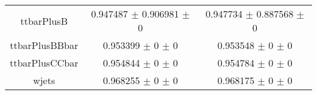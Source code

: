 \begin{table}
\begin{tabular}{ccc}
ttbarPlusB & \num{0.947487} $\pm$ \num{0.906981} $\pm$ \num{0} & \num{0.947734} $\pm$ \num{0.887568} $\pm$ \num{0}\\
ttbarPlusBBbar & \num{0.953399} $\pm$ \num{0} $\pm$ \num{0} & \num{0.953548} $\pm$ \num{0} $\pm$ \num{0}\\
ttbarPlusCCbar & \num{0.954844} $\pm$ \num{0} $\pm$ \num{0} & \num{0.954784} $\pm$ \num{0} $\pm$ \num{0}\\
wjets & \num{0.968255} $\pm$ \num{0} $\pm$ \num{0} & \num{0.968175} $\pm$ \num{0} $\pm$ \num{0}\\
\bottomrule
\end{tabular}
\end{table}